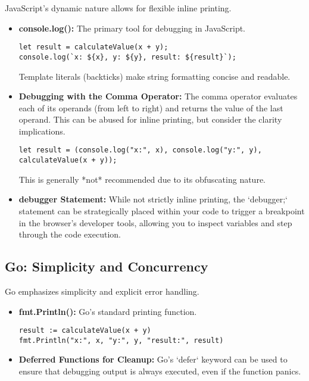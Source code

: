 \documentclass{article}
\begin{document}
{{{{JavaScript's dynamic nature allows for flexible inline printing.

\begin{itemize}
    \item \textbf{console.log():} The primary tool for debugging in JavaScript.

\begin{verbatim}
let result = calculateValue(x + y);
console.log(`x: ${x}, y: ${y}, result: ${result}`);
\end{verbatim}

        Template literals (backticks) make string formatting concise and readable.

    \item \textbf{Debugging with the Comma Operator:} The comma operator evaluates each of its operands (from left to right) and returns the value of the last operand. This can be abused for inline printing, but consider the clarity implications.

\begin{verbatim}
let result = (console.log("x:", x), console.log("y:", y), calculateValue(x + y));
\end{verbatim}

        This is generally *not* recommended due to its obfuscating nature.

    \item \textbf{debugger Statement:} While not strictly inline printing, the `debugger;` statement can be strategically placed within your code to trigger a breakpoint in the browser's developer tools, allowing you to inspect variables and step through the code execution.
\end{itemize}

\subsection*{Go: Simplicity and Concurrency}

Go emphasizes simplicity and explicit error handling.

\begin{itemize}
    \item \textbf{fmt.Println():} Go's standard printing function.

\begin{verbatim}
result := calculateValue(x + y)
fmt.Println("x:", x, "y:", y, "result:", result)
\end{verbatim}

    \item \textbf{Deferred Functions for Cleanup:} Go's `defer` keyword can be used to ensure that debugging output is always executed, even if the function panics.


\end{itemize}}}}}
\end{document}
